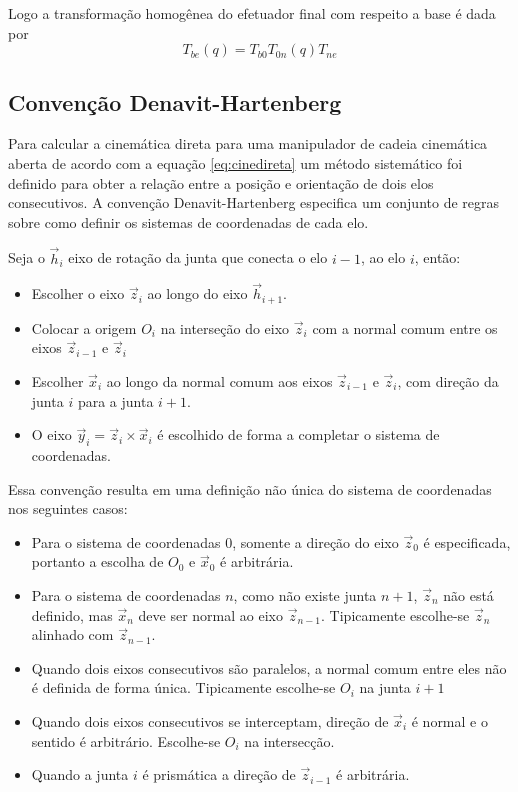 Logo a transformação homogênea do efetuador final com respeito a base é dada por
\begin{equation} \label{eq:base_efetuador}
{T}_{be}({q}) = {T}_{b0} {T}_{0n}({q}) {T}_{ne} 
\end{equation}

\subsection{Convenção Denavit-Hartenberg} \label{sec:denavit}
Para calcular a cinemática direta para uma manipulador de cadeia cinemática aberta de acordo com a equação \eqref{eq:cinedireta} um método sistemático foi definido para obter a relação entre a posição e orientação de dois elos consecutivos. A convenção Denavit-Hartenberg especifica um conjunto de regras sobre como definir os sistemas de coordenadas de cada elo.

Seja o $\vec{h}_i$ eixo de rotação da junta que conecta o elo $i-1$, ao elo $i$, então:

\begin{itemize}
\item Escolher o eixo $\vec{z}_i$ ao longo do eixo $\vec{h}_{i+1}$.
\item Colocar a origem $O_i$ na interseção do eixo $\vec{z}_i$ com a normal comum entre os eixos $\vec{z}_{i-1}$ e $\vec{z}_i$
\item Escolher $\vec{x}_i$ ao longo da normal comum aos eixos $\vec{z}_{i-1}$ e $\vec{z}_i$, com direção da junta $i$ para a junta $i+1$. 
\item O eixo $\vec{y}_i = \vec{z}_i \times \vec{x}_i$ é escolhido de forma a completar o sistema de coordenadas.
\end{itemize}

Essa convenção resulta em uma definição não única do sistema de coordenadas nos seguintes casos:

\begin{itemize}
\item Para o sistema de coordenadas $0$, somente a direção do eixo $\vec{z}_0$ é especificada, portanto a escolha de $O_0$ e $ \vec{x}_0$ é arbitrária.
\item Para o sistema de coordenadas $n$, como não existe junta $n+1$, $\vec{z}_n$ não está definido, mas $\vec{x}_n$ deve ser normal ao eixo $\vec{z}_{n-1}$. Tipicamente escolhe-se $\vec{z}_n$ alinhado com $\vec{z}_{n-1}$.
\item Quando dois eixos consecutivos são paralelos, a normal comum entre eles não é definida de forma única. Tipicamente escolhe-se $O_i$ na junta $i+1$
\item  Quando dois eixos consecutivos se interceptam, direção de $\vec{x}_i$ é normal e o sentido é arbitrário. Escolhe-se $O_i$ na intersecção.
\item Quando a junta $i$ é prismática a direção de $\vec{z}_{i-1}$ é arbitrária.
\end{itemize}

